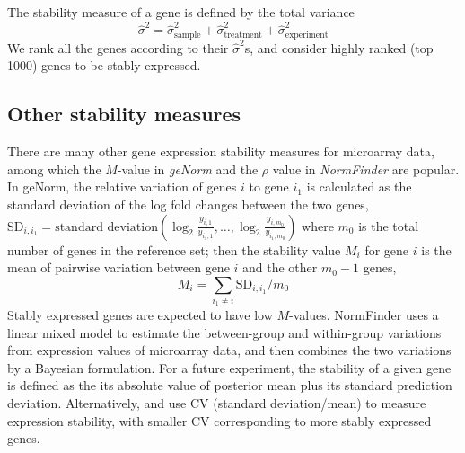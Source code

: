 \documentclass[11pt, a4paper]{article}
\begin{document}
The stability measure of a gene is defined by the total variance
 \begin{equation}\label{eq:totalVariance}
 \hat \sigma^2 =\hat\sigma_{\text{sample}}^2+ \hat\sigma_{\text{treatment}}^2+ \hat\sigma_{\text{experiment}}^2
 \end{equation}
We rank all the genes according to their $\hat\sigma^2$s, and consider highly ranked (top 1000) genes to be stably expressed. 

\subsection{Other stability measures}\label{subsection:OtherStabilityMeasure}
There are many other gene expression stability measures for microarray data, among which the $M$-value in \textit{geNorm} \citep{vandesompele2002accurate} and the $\rho$ value in \textit{NormFinder} \citep{andersen2004normalization} are popular. In geNorm, the relative variation of genes $i$ to gene $i_1$ is calculated as the standard deviation of the log fold changes between the two genes, $\text{SD}_{i, i_1} = \text{standard deviation}(\log_2 \frac{y_{i,1}}{y_{i_1,1}}, \ldots, \log_2 \frac{y_{i,m_0}}{y_{i_1,m_0}})$ where $m_0$ is the total number of genes in the reference set; then the stability value $M_i$ for gene $i$ is the mean of pairwise variation between gene $i$ and the other $m_0-1$ genes, 
\begin{equation}\label{eq:vvalue}
M_i = \sum_{i_1 \neq i}\text{SD}_{i, i_1}/m_0
\end{equation}
Stably expressed genes are expected to have low $M$-values. NormFinder uses a linear mixed model to estimate the between-group and within-group variations from expression values of microarray data, and then combines the two variations by a Bayesian formulation. For a future experiment, the stability of a given gene is defined as the its absolute value of posterior mean plus its standard prediction deviation. Alternatively, \cite{czechowski2005genome} and \cite{dekkers2012identification} use CV (standard deviation/mean) to measure expression stability, with smaller CV  corresponding to more stably expressed genes.
	
\end{document}
